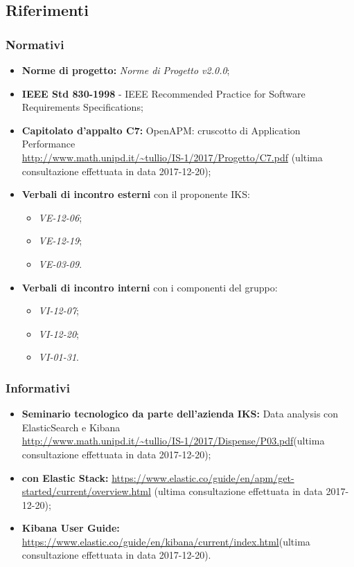 	\subsection{Riferimenti}
	\subsubsection{Normativi}
	\begin{itemize}
		\item \textbf{Norme di progetto:} \emph{Norme di Progetto v2.0.0};
		\item \textbf{IEEE Std 830-1998} - IEEE Recommended Practice for Software Requirements Specifications;
		\item \textbf{Capitolato d'appalto C7:} OpenAPM: cruscotto di Application Performance  \\ \url{http://www.math.unipd.it/~tullio/IS-1/2017/Progetto/C7.pdf} (ultima consultazione effettuata in data 2017-12-20);
		\item \textbf{Verbali di incontro esterni} con il proponente IKS: \begin{itemize}
			\item \emph{VE-12-06};
			\item \emph{VE-12-19};
			\item \emph{VE-03-09}.
		\end{itemize}
		\item \textbf{Verbali di incontro interni} con i componenti del gruppo:
		\begin{itemize}
			\item \emph{VI-12-07};
			\item \emph{VI-12-20};
			\item \emph{VI-01-31}.
		\end{itemize}
	\end{itemize}
	
	\subsubsection{Informativi}
	\begin{itemize}
		\item \textbf{Seminario tecnologico da parte dell'azienda IKS:} Data analysis con ElasticSearch e Kibana \\ \url{http://www.math.unipd.it/~tullio/IS-1/2017/Dispense/P03.pdf}(ultima consultazione effettuata in data 2017-12-20);
		\item \textbf{ con Elastic Stack:} \url{https://www.elastic.co/guide/en/apm/get-started/current/overview.html} (ultima consultazione effettuata in data 2017-12-20);
		\item \textbf{Kibana User Guide:} \url{https://www.elastic.co/guide/en/kibana/current/index.html}(ultima consultazione effettuata in data 2017-12-20).
	
	\end{itemize}
	